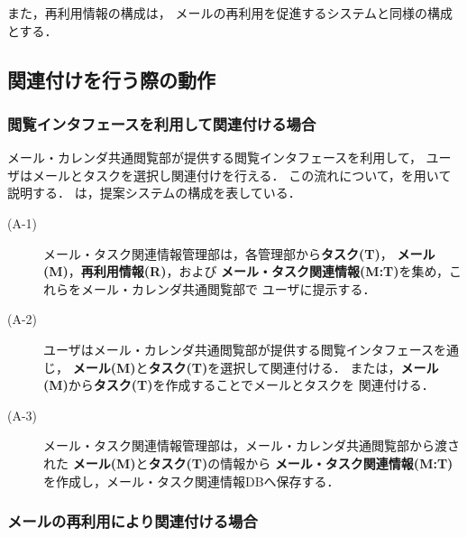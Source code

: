 \documentclass[submit,techreq,noauthor,dvipdfmx]{ipsj}
\begin{document}
また，再利用情報の構成は，
メールの再利用を促進するシステム\cite{kimuray2014a}と同様の構成とする．

\subsection{関連付けを行う際の動作}\label{sec:system_action}


\subsubsection{閲覧インタフェースを利用して関連付ける場合}
\label{sec:system_action1}

メール・カレンダ共通閲覧部が提供する閲覧インタフェースを利用して，
ユーザはメールとタスクを選択し関連付けを行える．
この流れについて，を用いて説明する．
は，提案システムの構成を表している．
\begin{description}

\item[(A-1)] メール・タスク関連情報管理部は，各管理部から{\bf タスク(T)}，
  {\bf メール(M)}，{\bf 再利用情報(R)}，および
  {\bf メール・タスク関連情報(M:T)}を集め，これらをメール・カレンダ共通閲覧部で
  ユーザに提示する．

\item[(A-2)] ユーザはメール・カレンダ共通閲覧部が提供する閲覧インタフェースを通じ，
  {\bf メール(M)}と{\bf タスク(T)}を選択して関連付ける．
  または，{\bf メール(M)}から{\bf タスク(T)}を作成することでメールとタスクを
  関連付ける．

\item[(A-3)] メール・タスク関連情報管理部は，メール・カレンダ共通閲覧部から渡された
  {\bf メール(M)}と{\bf タスク(T)}の情報から
  {\bf メール・タスク関連情報(M:T)}を作成し，メール・タスク関連情報DBへ保存する．

\end{description}

\subsubsection{メールの再利用により関連付ける場合}
\label{sec:system_action2}
\end{document}
